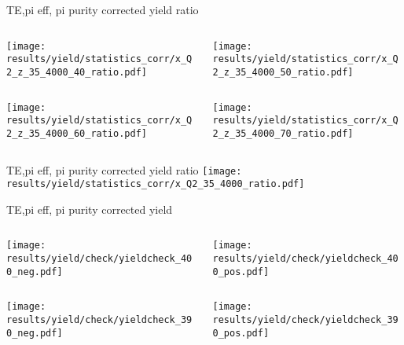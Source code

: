 \begin{frame}{TE,pi eff, pi purity corrected yield ratio}
\begin{columns}
\begin{column}[T]{0.5\textwidth}
\texttt{[image: results/yield/statistics\_corr/x\_Q2\_z\_35\_4000\_40\_ratio.pdf]}
\end{column}
\begin{column}[T]{0.5\textwidth}
\texttt{[image: results/yield/statistics\_corr/x\_Q2\_z\_35\_4000\_50\_ratio.pdf]}
\end{column}
\end{columns}
\begin{columns}
\begin{column}[T]{0.5\textwidth}
\texttt{[image: results/yield/statistics\_corr/x\_Q2\_z\_35\_4000\_60\_ratio.pdf]}
\end{column}
\begin{column}[T]{0.5\textwidth}
\texttt{[image: results/yield/statistics\_corr/x\_Q2\_z\_35\_4000\_70\_ratio.pdf]}
\end{column}
\end{columns}
\end{frame}
\begin{frame}{TE,pi eff, pi purity corrected yield ratio}
\texttt{[image: results/yield/statistics\_corr/x\_Q2\_35\_4000\_ratio.pdf]}
\end{frame}
\begin{frame}{TE,pi eff, pi purity corrected yield}
\begin{columns}
\begin{column}[T]{0.5\textwidth}
\texttt{[image: results/yield/check/yieldcheck\_400\_neg.pdf]}
\end{column}
\begin{column}[T]{0.5\textwidth}
\texttt{[image: results/yield/check/yieldcheck\_400\_pos.pdf]}
\end{column}
\end{columns}
\begin{columns}
\begin{column}[T]{0.5\textwidth}
\texttt{[image: results/yield/check/yieldcheck\_390\_neg.pdf]}
\end{column}
\begin{column}[T]{0.5\textwidth}
\texttt{[image: results/yield/check/yieldcheck\_390\_pos.pdf]}
\end{column}
\end{columns}
\end{frame}
